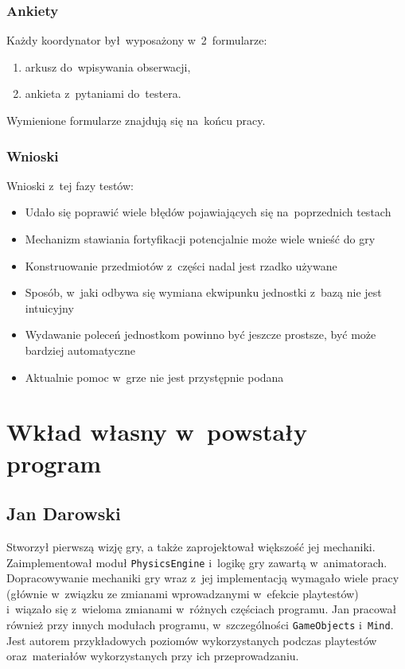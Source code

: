 \documentclass[licencjacka]{pracamgr}
\begin{document}
    \subsection{Ankiety}
      Każdy koordynator był~wyposażony w~2~formularze:
      \begin{enumerate}
	\item arkusz do~wpisywania obserwacji,
	\item ankieta z~pytaniami do~testera.
      \end{enumerate}

      \noindent
      Wymienione formularze znajdują się na~końcu pracy.

    \subsection{Wnioski}
      Wnioski z~tej fazy testów:
      \begin{itemize}
	\item Udało się poprawić wiele błędów pojawiających się na~poprzednich testach
	\item Mechanizm stawiania fortyfikacji potencjalnie może wiele wnieść do gry
	\item Konstruowanie przedmiotów z~części nadal jest rzadko używane
	\item Sposób, w~jaki odbywa się wymiana ekwipunku jednostki z~bazą nie jest intuicyjny
	\item Wydawanie poleceń jednostkom powinno być jeszcze prostsze, być może bardziej automatyczne
	\item Aktualnie pomoc w~grze nie jest przystępnie podana
      \end{itemize}


\chapter{Wkład własny w~powstały program}

  \section{Jan Darowski}
    Stworzył pierwszą wizję gry, a także zaprojektował większość jej mechaniki. Zaimplementował moduł \texttt{PhysicsEngine}
    i~logikę gry zawartą w~animatorach. Dopracowywanie mechaniki gry wraz z~jej implementacją wymagało wiele pracy (głównie w~związku
    ze zmianami wprowadzanymi w~efekcie playtestów) i~wiązało się z~wieloma zmianami w~różnych częściach programu. 
    Jan pracował również przy innych modułach programu, w~szczególności \texttt{GameObjects} i~\texttt{Mind}. 
    Jest autorem przykładowych poziomów wykorzystanych podczas playtestów oraz~materiałów wykorzystanych przy ich przeprowadzaniu.
\end{document}
